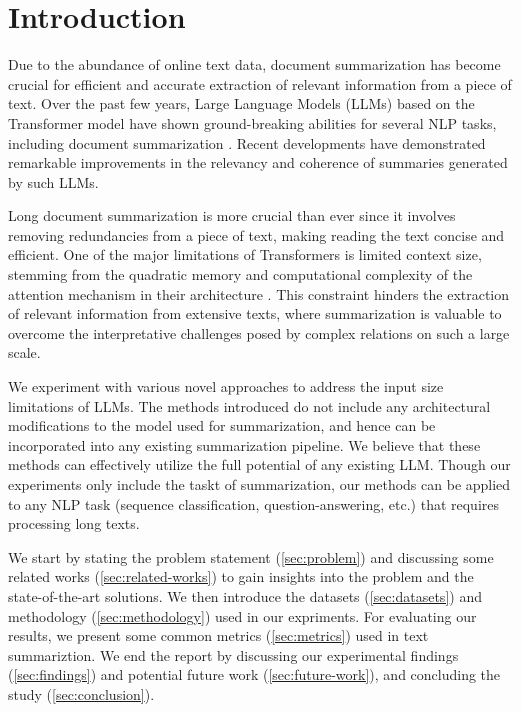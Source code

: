\section{Introduction}
\label{sec:introduction}

Due to the abundance of online text data, document summarization has become crucial
for efficient and accurate extraction of relevant information from a piece of text.
Over the past few years, Large Language Models (LLMs) based on the Transformer model
\cite{vaswani2017attention} have shown ground-breaking abilities for several NLP tasks,
including document summarization \cite{yadav2023state}.
Recent developments have demonstrated remarkable improvements in the relevancy and
coherence of summaries generated by such LLMs.

Long document summarization is more crucial than ever since it involves removing redundancies
from a piece of text, making reading the text concise and efficient.
One of the major limitations of Transformers is limited context size, stemming from the
quadratic memory and computational complexity of the attention mechanism in their architecture
\cite{du2023improving}.
This constraint hinders the extraction of relevant information from extensive texts, where
summarization is valuable to overcome the interpretative challenges posed by complex
relations on such a large scale.

We experiment with various novel approaches to address the input size limitations of LLMs.
The methods introduced do not include any architectural modifications to the model used for
summarization, and hence can be incorporated into any existing summarization pipeline.
We believe that these methods can effectively utilize the full potential of any existing LLM.
Though our experiments only include the taskt of summarization, our methods can be applied
to any NLP task (sequence classification, question-answering, etc.) that requires processing
long texts.

We start by stating the problem statement (\ref{sec:problem}) and discussing some related works
(\ref{sec:related-works}) to gain insights into the problem and the state-of-the-art solutions.
We then introduce the datasets (\ref{sec:datasets}) and methodology (\ref{sec:methodology}) used
in our expriments.
For evaluating our results, we present some common metrics (\ref{sec:metrics}) used in text
summariztion.
We end the report by discussing our experimental findings (\ref{sec:findings}) and potential
future work (\ref{sec:future-work}), and concluding the study (\ref{sec:conclusion}).
